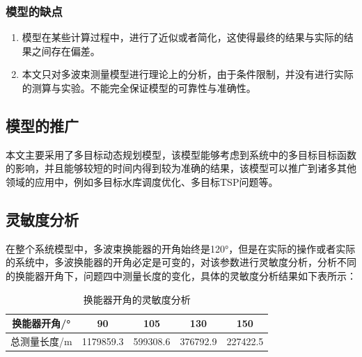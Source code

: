 \documentclass[12pt,a4paper]{article}
\begin{document}
\subsubsection{模型的缺点}
\begin{enumerate}
	\item 模型在某些计算过程中，进行了近似或者简化，这使得最终的结果与实际的结果之间存在偏差。
	\item 本文只对多波束测量模型进行理论上的分析，由于条件限制，并没有进行实际的测算与实验。不能完全保证模型的可靠性与准确性。
\end{enumerate}

\subsection{模型的推广}
本文主要采用了多目标动态规划模型，该模型能够考虑到系统中的多目标目标函数的影响，并且能够较短的时间内得到较为准确的结果，该模型可以推广到诸多其他领域的应用中，例如多目标水库调度优化、多目标TSP问题等。

\subsection{灵敏度分析}
在整个系统模型中，多波束换能器的开角始终是120°，但是在实际的操作或者实际的系统中，多波换能器的开角必定是可变的，对该参数进行灵敏度分析，分析不同的换能器开角下，问题四中测量长度的变化，具体的灵敏度分析结果如下表所示：
\begin{table}[H]
	\centering
	\caption{换能器开角的灵敏度分析}
	\label{tab3}
	\begin{tabular}{|c|c|c|c|c|}
		\hline
		换能器开角/° & 90        & 105      & 130      & 150      \\ \hline
		总测量长度/m & 1179859.3 & 599308.6 & 376792.9 & 227422.5 \\ \hline
	\end{tabular}
\end{table}
\end{document}

